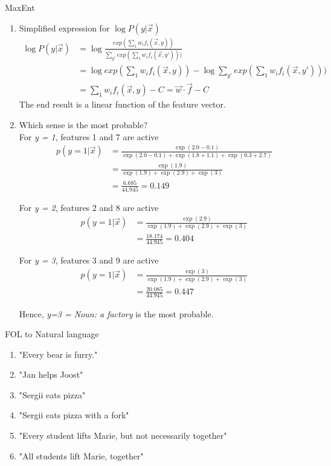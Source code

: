 \documentclass[12pt]{article}
\newenvironment{exercise}[2][Exercise]{\begin{trivlist}
\item[\hskip \labelsep {\bfseries #1}\hskip \labelsep {\bfseries #2.}]}{\end{trivlist}}
\begin{document}
\begin{exercise}{2} MaxEnt
\begin{enumerate}[label=(\alph*)]

\item Simplified expression for $\log{P(y|\vec{x})}$
\begin{align*}
 \log{P(y|\vec{x})} &= \log{\frac{exp(\sum_1 w_i f_i(\vec{x},y))}{\sum_{y'} exp(\sum_1 w_i f_i(\vec{x},y')))}} \\
 &= \log{exp(\sum_1 w_i f_i(\vec{x},y))} -  \log{\sum_{y'} exp(\sum_1 w_i f_i(\vec{x},y')))} \\
 &= \sum_1 w_i f_i(\vec{x},y) -  C = \vec{w} \cdot \vec{f} - C
\end{align*}
The end result is a linear function of the feature vector.
	
\item Which sense is the most probable? \\

For \textit{y = 1}, features 1 and 7 are active
\begin{align}
p(y=1|\vec{x}) &= \frac{\exp(2.0 -0.1)}{\exp(2.0-0.1)+ \exp(1.8+1.1) + \exp(0.3+2.7)} \\
&= \frac{\exp(1.9)}{\exp(1.9)+ \exp(2.9) + \exp(3)}\\
&= \frac{6.685}{44.945} = 0.149
\end{align}

For \textit{y = 2}, features 2 and 8 are active
\begin{align}
p(y=1|\vec{x}) &= \frac{\exp(2.9)}{\exp(1.9)+ \exp(2.9) + \exp(3)}\\
&= \frac{18.174}{44.945}  = 0.404
\end{align}

For \textit{y = 3}, features 3 and 9 are active
\begin{align}
p(y=1|\vec{x}) &= \frac{\exp(3)}{\exp(1.9)+ \exp(2.9) + \exp(3)}\\
&= \frac{20.085}{44.945}  = 0.447
\end{align}

Hence, \textit{y=3 = Noun: a factory} is the most probable.

\end{enumerate}
\end{exercise}

\begin{exercise}{3} FOL to Natural language
\begin{enumerate}[label=(\alph*)]
\item "Every bear is furry."
\item "Jan helps Joost"
\item "Sergii eats pizza"
\item "Sergii eats pizza with a fork" 
\item "Every student lifts Marie, but not necessarily together"
\item "All students lift Marie, together"
\end{enumerate}
\end{exercise}
 
\end{document}
